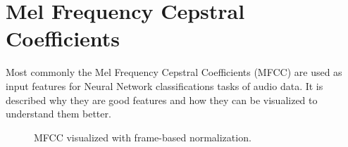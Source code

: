 
\section{Mel Frequency Cepstral Coefficients}\label{sec:signal_mfcc}
Most commonly the Mel Frequency Cepstral Coefficients (MFCC) are used as input features for Neural Network classifications tasks of audio data.
It is described why they are good features and how they can be visualized to understand them better.

\begin{figure}[!ht]
  \centering
  \caption{MFCC visualized with frame-based normalization.}
  \label{fig:signal_mfcc_examples}
\end{figure}
\FloatBarrier
\noindent

